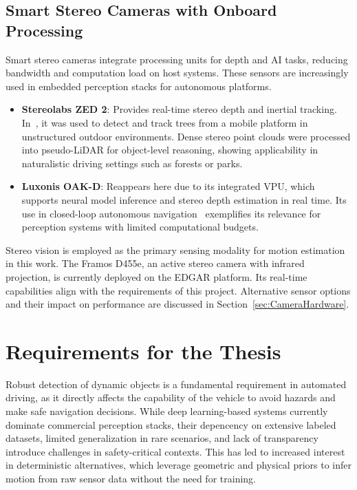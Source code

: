 \subsection{Smart Stereo Cameras with Onboard Processing}\label{sec:SmartStereoCameras}

Smart stereo cameras integrate processing units for depth and AI tasks,
reducing bandwidth and computation load on host systems. These sensors are
increasingly used in embedded perception stacks for autonomous platforms.

\begin{itemize}
  \item \textbf{Stereolabs ZED 2}: Provides real-time stereo depth and inertial
  tracking. In~\cite{paperZed}, it was used to detect and track trees from a
  mobile platform in unstructured outdoor environments. Dense stereo point
  clouds were processed into pseudo-LiDAR for object-level reasoning, showing
  applicability in naturalistic driving settings such as forests or parks.

  \item \textbf{Luxonis OAK-D}: Reappears here due to its integrated VPU, which
  supports neural model inference and stereo depth estimation in real time.
  Its use in closed-loop autonomous navigation~\cite{paperLuxonis} exemplifies
  its relevance for perception systems with limited computational budgets.
\end{itemize}

Stereo vision is employed as the primary sensing modality for motion estimation
in this work. The Framos D455e, an active stereo camera with infrared projection,
is currently deployed on the EDGAR platform. Its real-time
capabilities align with the requirements of this project. 
Alternative sensor options and their impact on performance are
discussed in Section~\ref{sec:CameraHardware}.

\section{Requirements for the Thesis}\label{sec:RequirementsForTheThesis}

Robust detection of dynamic objects is a fundamental requirement in automated
driving, as it directly affects the capability of the vehicle to avoid hazards and
make safe navigation decisions. While deep learning-based systems currently
dominate commercial perception stacks, their depencency on extensive labeled
datasets, limited generalization in rare scenarios, and lack of transparency
introduce challenges in safety-critical contexts. This has led to increased
interest in deterministic alternatives, which leverage geometric and physical
priors to infer motion from raw sensor data without the need for training.

